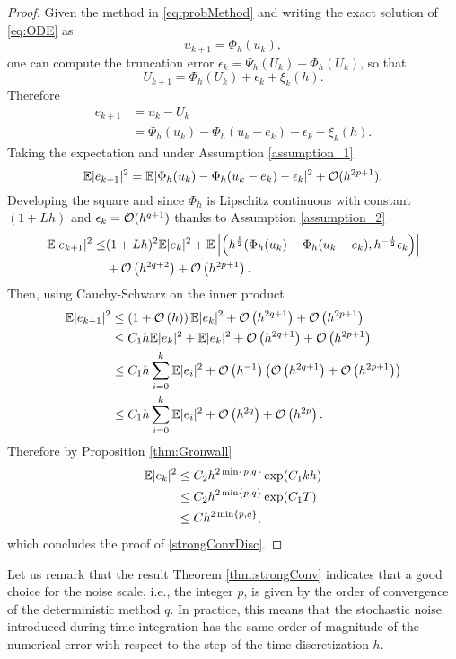 \begin{proof}
Given the method in \eqref{eq:probMethod} and writing the exact solution of \eqref{eq:ODE} as
\begin{equation}
	u_{k+1} = \Phi_h(u_k),
\end{equation}
one can compute the truncation error $\epsilon_k = \Psi_h(U_k) - \Phi_h(U_k)$, so that
\begin{equation}
	U_{k+1} = \Phi_h(U_k) + \epsilon_k + \xi_k(h).
\end{equation}
Therefore
\begin{align}
	e_{k+1} &= u_k - U_k \\
			&= \Phi_h(u_k) - \Phi_h(u_k - e_k) - \epsilon_k - \xi_k(h).
\end{align}
Taking the expectation and under Assumption \ref{assumption_1}
\begin{equation}
	\mathbb{E}|e_{k+1}|^2 = \mathbb{E}|\Phi_h(u_k) - \Phi_h(u_k - e_k) - \epsilon_k|^2 + \mathcal{O}(h^{2p + 1}).
\end{equation}
Developing the square and since $\Phi_h$ is Lipschitz continuous with constant $(1 + Lh)$ and $\epsilon_k = \mathcal{O}(h^{q+1})$ thanks to Assumption \ref{assumption_2}
\begin{align}
	\mathbb{E}|e_{k+1}|^2 \leq &(1 + Lh)^2 \mathbb{E}|e_k|^2 + \mathbb{E}\left|\left(h^{\frac{1}{2}}(\Phi_h(u_k) - \Phi_h(u_k - e_k), h^{-\frac{1}{2}}\epsilon_k\right)\right| \\
						 &+ \mathcal{O}\left(h^{2q+2}\right) + \mathcal{O}\left(h^{2p + 1}\right). 
\end{align}
Then, using Cauchy-Schwarz on the inner product
\begin{align}
	\mathbb{E}|e_{k+1}|^2 &\leq \left(1 + \mathcal{O}\left(h\right)\right)\mathbb{E}|e_k|^2 + \mathcal{O}\left(h^{2q + 1}\right) + \mathcal{O}\left(h^{2p + 1}\right) \\
	&\leq C_1 h \mathbb{E}|e_k|^2 + \mathbb{E}|e_k|^2 + \mathcal{O}\left(h^{2q + 1}\right) + \mathcal{O}\left(h^{2p + 1}\right) \\
	&\leq C_1 h \sum_{i = 0}^{k}\mathbb{E}|e_i|^2 + \mathcal{O}\left(h^{-1}\right)\left(\mathcal{O}\left(h^{2q + 1}\right) + \mathcal{O}\left(h^{2p + 1}\right)\right)\\
	&\leq C_1 h \sum_{i = 0}^{k}\mathbb{E}|e_i|^2 + \mathcal{O}\left(h^{2q}\right) + \mathcal{O}\left(h^{2p}\right).
\end{align}
Therefore by Proposition \ref{thm:Gronwall}
\begin{align}
	\mathbb{E}|e_{k}|^2 &\leq C_2 h^{2\min\{p,q\}} \exp(C_1kh)\\ 
		      &\leq C_2 h^{2\min\{p,q\}} \exp(C_1T) \\	
		      &\leq Ch^{2\min\{p,q\}},
\end{align}  	
which concludes the proof of \eqref{strongConvDisc}.
\end{proof}
\begin{remark} Let us remark that the result Theorem \ref{thm:strongConv} indicates that a good choice for the noise scale, i.e., the integer $p$, is given by the order of convergence of the deterministic method $q$. In practice, this means that the stochastic noise introduced during time integration has the same order of magnitude of the numerical error with respect to the step of the time discretization $h$. 
\end{remark}